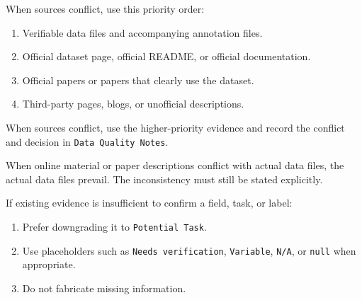 \begin{tcolorbox}
\smallskip{}\par\smallskip

\noindent When sources conflict, use this priority order:\par\smallskip

\begin{enumerate}[leftmargin=1.5em,noitemsep,topsep=2pt]
\item Verifiable data files and accompanying annotation files.
\item Official dataset page, official README, or official documentation.
\item Official papers or papers that clearly use the dataset.
\item Third-party pages, blogs, or unofficial descriptions.
\end{enumerate}

\smallskip{}\par\smallskip

\noindent When sources conflict, use the higher-priority evidence and record the conflict and decision in \texttt{Data Quality Notes}.\par\smallskip

\smallskip{}\par\smallskip

\noindent When online material or paper descriptions conflict with actual data files, the actual data files prevail. The inconsistency must still be stated explicitly.\par\smallskip

\smallskip{}\par\smallskip

\noindent If existing evidence is insufficient to confirm a field, task, or label:\par\smallskip

\begin{enumerate}[leftmargin=1.5em,noitemsep,topsep=2pt]
\item Prefer downgrading it to \texttt{Potential Task}.
\item Use placeholders such as \texttt{Needs verification}, \texttt{Variable}, \texttt{N/A}, or \texttt{null} when appropriate.
\item Do not fabricate missing information.
\end{enumerate}


\end{tcolorbox}
